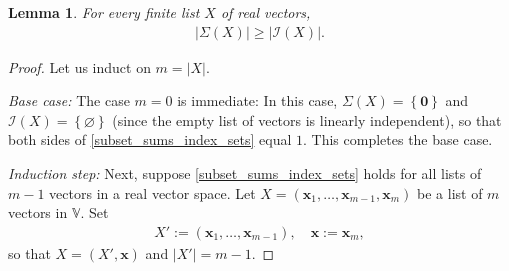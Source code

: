 \documentclass[12pt]{article}
\renewcommand{\emptyset}{\varnothing} %
\newtheorem{lemma}[theorem]{Lemma}
\theoremstyle{definition}
\theoremstyle{remark}
\newcommand{\VV}{\mathbb{V}} %
\newcommand{\set}[1]{\left\{ #1 \right\}}
\newcommand{\abs}[1]{\left| #1 \right|}
\newcommand{\tup}[1]{\left( #1 \right)}
\begin{document}
\begin{lemma}\label{vector-list}
    For every finite list $X$ of real vectors, \begin{align}\label{subset_sums_index_sets}
        \abs{\Sigma(X)} \geq \abs{\mathcal{I}(X)}.
    \end{align}
\end{lemma}

\begin{proof}
    Let us induct on $m=\abs{X}$.
    \medskip
    
    \textit{Base case:} The case $m=0$ is immediate: In this case, $\Sigma(X) = \set{\mathbf{0}}$ and $\mathcal{I}\tup{X} = \set{\emptyset}$ (since the empty list of vectors is linearly independent), so that both sides of \eqref{subset_sums_index_sets} equal $1$. This completes the base case.


    \medskip
    \textit{Induction step:} Next, suppose \eqref{subset_sums_index_sets} holds for all lists of $m-1$ vectors in a real vector space. Let $X = \tup{\mathbf{x}_1,\ldots,\mathbf{x}_{m-1},\mathbf{x}_m}$ be a list of $m$ vectors in $\VV$. Set \begin{align*}
        X' := \tup{\mathbf{x}_1,\ldots,\mathbf{x}_{m-1}}, \quad \mathbf{x} := \mathbf{x}_m,
    \end{align*} so that $X = \tup{X',\mathbf{x}}$ and $|X'|=m-1$.


\end{proof}
\end{document}
